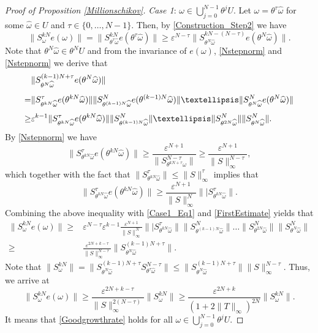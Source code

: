 \documentclass[10pt,a4paper]{amsart}
\newcommand{\eps}{\varepsilon}
\begin{document}
\begin{proof}[Proof of Proposition \ref{Millionschikov}]
\noindent
\emph{Case 1}: $\omega\in \bigcup_{j=0}^{N-1}\theta^j U$. Let $\omega=\theta^{\tau}\widehat \omega$ for some $\widehat\omega\in U$ and $\tau\in\{0,\dots,N-1\}$. Then, by \eqref{Construction_Step2} we have 
\begin{equation}\label{Case1_Eq1}
\|S_{\omega}^{kN} e(\omega)\|=\|S_{\theta^{\tau}\widehat\omega}^{kN}e(\theta^{\tau}\widehat\omega)\|\geq \eps^{N-\tau} \|S_{\theta^N\widehat\omega}^{kN-(N-\tau)}e(\theta^N\widehat\omega)\|.
\end{equation}
Note that $\theta^N\widehat\omega\in \theta^N U$ and from the invariance of $e(\omega)$, \eqref{Nstepnorm} and \eqref{Nstepnorm}  we derive that 
\begin{align}
&\|S_{\theta^N\widehat\omega}^{(k-1)N+\tau}e(\theta^N\widehat\omega)\|\notag\\[1ex]
=&\|S_{\theta^{kN}\widehat\omega}^{\tau}e(\theta^{kN}\widehat\omega)\| \|S^{N}_{\theta^{(k-1)N}\widehat\omega}e(\theta^{(k-1)N}\widehat\omega)\|\dots\|S^N_{\theta^N\widehat\omega}e(\theta^N\widehat\omega)\|\notag\\[1ex]
\geq& 
\eps^{k-1}\|S_{\theta^{kN}\widehat\omega}^{\tau}e(\theta^{kN}\widehat\omega)\| \|S^{N}_{\theta^{(k-1)N}\widehat\omega}\|\dots\|S^N_{\theta^{2N}\widehat\omega}\|\|S^N_{\theta^N\widehat\omega}\|.\label{FirstEstimate}
\end{align}
By \eqref{Nstepnorm} we have 
\[
\|S_{\theta^{kN}\widehat\omega}^{\tau}e(\theta^{kN}\widehat\omega)\|\geq \frac{\eps^{N+1}}{\|S_{\theta^{kN+\tau}\widehat\omega}^{N-\tau}\|}
\geq 
\frac{\eps^{N+1}}{\|S\|_{\infty}^{N-\tau}},
\]
which together with the fact that $\|S_{\theta^{kN}\widehat\omega}^{\tau}\|\leq \|S\|_{\infty}^{\tau}$ implies that 
\[
\|S_{\theta^{kN}\widehat\omega}^{\tau}e(\theta^{kN}\widehat\omega)\|
\geq
\frac{\eps^{N+1}}{\|S\|_{\infty}^{N}} \||S_{\theta^{kN}\widehat\omega}^{\tau}\|.
\]
Combining the above inequality with \eqref{Case1_Eq1} and \eqref{FirstEstimate} yields that 
\begin{align*}
\|S_{\omega}^{kN}e(\omega)\|
\geq &
\eps^{N-\tau}\eps^{k-1}
\frac{\eps^{N+1}}{\|S\|_{\infty}^N} \||S_{\theta^{kN}\widehat\omega}^{\tau}\|\|S^{N}_{\theta^{(k-1)N}\widehat\omega}\|\dots\|S^N_{\theta^{2N}\widehat\omega}\|\|S^N_{\theta^N\widehat\omega}\|\\[1ex]
\geq &
\frac{\eps^{2N+k-\tau}}{\|S\|_{\infty}^{N-\tau}}\|S_{\theta^N\widehat\omega}^{(k-1)N+\tau}\|.
\end{align*}
Note that $\|S_{\omega}^{kN}\|=\|S_{\theta^N\widehat\omega}^{(k-1)N+\tau}S_{\theta^{\tau}\widehat\omega}^{N-\tau}\|
\leq \|S_{\theta^N\widehat\omega}^{(k-1)N+\tau}\|\|S\|_{\infty}^{N-\tau}$. Thus, we arrive at 
\[
\|S_{\omega}^{kN}e(\omega)\|
\geq 
\frac{\eps^{2N+k-\tau}}{\|S\|_{\infty}^{2(N-\tau)}}\|S_{\omega}^{kN}\|
\geq 
\frac{\eps^{2N+k}}{( 1+2\|T\|_{\infty})^{2N}}\|S_{\omega}^{kN}\|.
\]
It means that \eqref{Goodgrowthrate} holds for all $\omega\in \bigcup_{j=0}^{N-1}\theta^j U$.


\end{proof}
\end{document}
